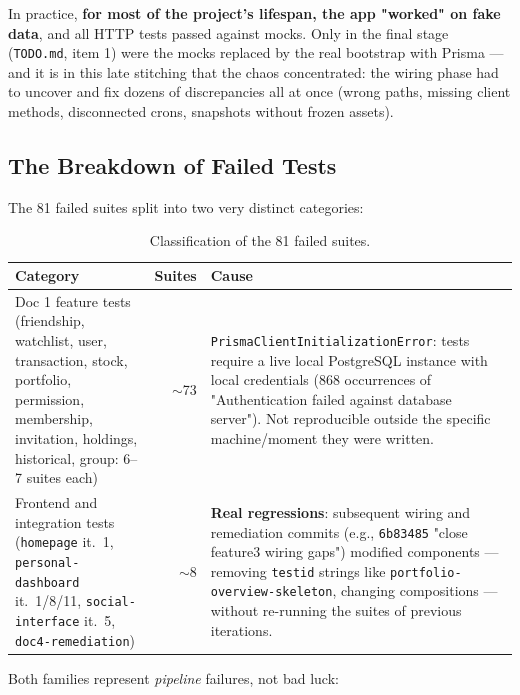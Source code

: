 \documentclass[11pt,a4paper]{article}
\newcommand{\fail}[1]{\textcolor{failred}{\textbf{#1}}}
\newcommand{\file}[1]{\texttt{\small #1}}
\begin{document}
	In practice, \textbf{for most of the project's lifespan, the app "worked" on fake data}, and all HTTP tests passed against mocks. Only in the final stage (\file{TODO.md}, item 1) were the mocks replaced by the real bootstrap with Prisma --- and it is in this late stitching that the chaos concentrated: the wiring phase had to uncover and fix dozens of discrepancies all at once (wrong paths, missing client methods, disconnected crons, snapshots without frozen assets).
	
	\subsection{The Breakdown of Failed Tests}
	\label{sec:test-breakdown}
	
	The 81 failed suites split into two very distinct categories:
	
	\begin{table}[h!]
		\centering
		\small
		\begin{tabular}{p{6.2cm}rp{6.2cm}}
			\toprule
			\textbf{Category} & \textbf{Suites} & \textbf{Cause} \\
			\midrule
			Doc 1 feature tests (friendship, watchlist, user, transaction, stock, portfolio, permission, membership, invitation, holdings, historical, group: 6--7 suites each) & $\sim$73 & \file{PrismaClientInitializationError}: tests require a live local PostgreSQL instance with local credentials (868 occurrences of "Authentication failed against database server"). Not reproducible outside the specific machine/moment they were written. \\
			\addlinespace
			Frontend and integration tests (\file{homepage} it.~1, \file{personal-dashboard} it.~1/8/11, \file{social-interface} it.~5, \file{doc4-remediation}) & $\sim$8 & \fail{Real regressions}: subsequent wiring and remediation commits (e.g., \file{6b83485} "close feature3 wiring gaps") modified components --- removing \file{testid} strings like \file{portfolio-overview-skeleton}, changing compositions --- without re-running the suites of previous iterations. \\
			\bottomrule
		\end{tabular}
		\caption{Classification of the 81 failed suites.}
	\end{table}
	
	Both families represent \emph{pipeline} failures, not bad luck:
	
\end{document}
